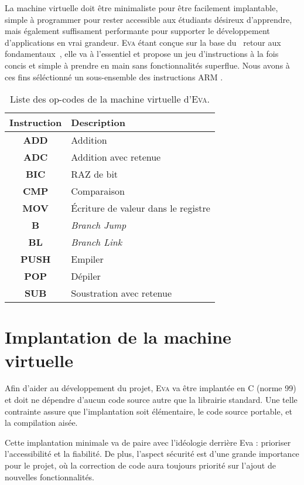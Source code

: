 \documentclass[11pt,twoside,french]{article}
\makeatletter
\providecommand{\og}{\leavevmode\flqq~}%
\providecommand{\fg}{\ifdim\lastskip>\z@\unskip\fi~\frqq}%
\newcommand{\noun}[1]{\textsc{#1}}
\makeatother
\begin{document}
La machine virtuelle doit être minimaliste pour être facilement implantable,
simple à programmer pour rester accessible aux étudiants désireux
d'apprendre, mais également suffisament performante pour supporter
le développement d'applications en vrai grandeur. \noun{Eva} étant
conçue sur la base du \og retour aux fondamentaux\fg , elle va à l'essentiel
et propose un jeu d'instructions à la fois concis et simple à prendre
en main sans fonctionnalités superflue. Nous avons à ces fins séléctionné
un sous-ensemble des instructions ARM .
\begin{table}[bp]
\begin{centering}
\begin{tabular}{|c|l|}
\hline
\textbf{Instruction} & \textbf{Description}\\
\hline
\hline
\textbf{ADD} & Addition\\
\hline
\textbf{ADC} & Addition avec retenue\\
\hline
\textbf{BIC} & RAZ de bit\\
\hline
\textbf{CMP} & Comparaison\\
\hline
\textbf{MOV} & Écriture de valeur dans le registre\\
\hline
\textbf{B} & \emph{Branch Jump}\\
\hline
\textbf{BL} & \emph{Branch Link}\\
\hline
\textbf{PUSH} & Empiler\\
\hline
\textbf{POP} & Dépiler\\
\hline
\textbf{SUB} & Soustration avec retenue\\
\hline
\end{tabular}
\par\end{centering}
\caption{\label{tab:opcodes}Liste des op-codes de la machine virtuelle d'\noun{Eva}.}
\end{table}


\section{Implantation de la machine virtuelle}

Afin d'aider au développement du projet, \noun{Eva} va être implantée
en C (norme 99) et doit ne dépendre d'aucun code source autre que
la librairie standard. Une telle contrainte assure que l'implantation
soit élémentaire, le code source portable, et la compilation aisée.

Cette implantation minimale va de paire avec l'idéologie derrière
Eva : prioriser l'accessibilité et la fiabilité. De plus, l'aspect
sécurité est d'une grande importance pour le projet, où la correction
de code aura toujours priorité sur l'ajout de nouvelles fonctionnalités.
\end{document}
